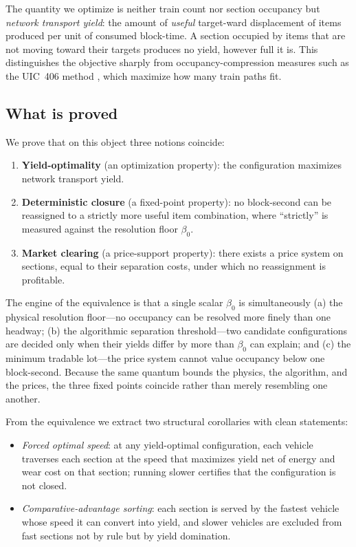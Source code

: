 \documentclass[11pt,twocolumn,a4paper]{article}
\theoremstyle{definition}
\theoremstyle{remark}
\newcommand{\blocktime}{\beta_0}
\begin{document}
The quantity we optimize is neither train count nor section occupancy but \emph{network transport yield}: the amount of \emph{useful} target-ward displacement of items produced per unit of consumed block-time. A section occupied by items that are not moving toward their targets produces no yield, however full it is. This distinguishes the objective sharply from occupancy-compression measures such as the UIC~406 method \cite{uic406,abril2008}, which maximize how many train paths fit.

\subsection{What is proved}

We prove that on this object three notions coincide:

\begin{enumerate}[nosep]
\item \textbf{Yield-optimality} (an optimization property): the configuration maximizes network transport yield.
\item \textbf{Deterministic closure} (a fixed-point property): no block-second can be reassigned to a strictly more useful item combination, where ``strictly'' is measured against the resolution floor $\blocktime$.
\item \textbf{Market clearing} (a price-support property): there exists a price system on sections, equal to their separation costs, under which no reassignment is profitable.
\end{enumerate}

The engine of the equivalence is that a single scalar $\blocktime$ is simultaneously (a) the physical resolution floor---no occupancy can be resolved more finely than one headway; (b) the algorithmic separation threshold---two candidate configurations are decided only when their yields differ by more than $\blocktime$ can explain; and (c) the minimum tradable lot---the price system cannot value occupancy below one block-second. Because the same quantum bounds the physics, the algorithm, and the prices, the three fixed points coincide rather than merely resembling one another.

From the equivalence we extract two structural corollaries with clean statements:

\begin{itemize}[nosep]
\item \emph{Forced optimal speed}: at any yield-optimal configuration, each vehicle traverses each section at the speed that maximizes yield net of energy and wear cost on that section; running slower certifies that the configuration is not closed.
\item \emph{Comparative-advantage sorting}: each section is served by the fastest vehicle whose speed it can convert into yield, and slower vehicles are excluded from fast sections not by rule but by yield domination.
\end{itemize}
\end{document}
